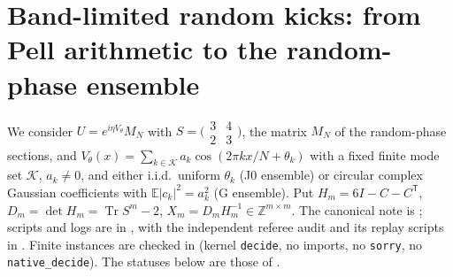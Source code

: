 \section{Band-limited random kicks: from Pell arithmetic to the random-phase ensemble}
\label{sec:band-limited-kick-bridge}
We consider \(U=e^{i\eta V_\theta}M_N\) with \(S=\bigl(\begin{smallmatrix}3&4\\2&3\end{smallmatrix}\bigr)\), the matrix
\(M_N\) of the random-phase sections, and \(V_\theta(x)=\sum_{k\in\mathcal K}a_k\cos(2\pi kx/N+\theta_k)\) with a fixed
finite mode set \(\mathcal K\), \(a_k\neq0\), and either i.i.d.\ uniform \(\theta_k\) (J0 ensemble) or circular complex
Gaussian coefficients with \(\mathbb E|c_k|^2=a_k^2\) (G ensemble). Put \(H_m=6I-C-C^{\mathsf T}\),
\(D_m=\det H_m=\operatorname{Tr}S^m-2\), \(X_m=D_mH_m^{-1}\in\mathbb Z^{m\times m}\).
The canonical note is ; scripts and logs are in
, with the independent referee audit and its replay scripts in
. Finite instances are checked in
 (kernel \texttt{decide}, no imports, no \texttt{sorry}, no \texttt{native\_decide}).
The statuses below are those of .

